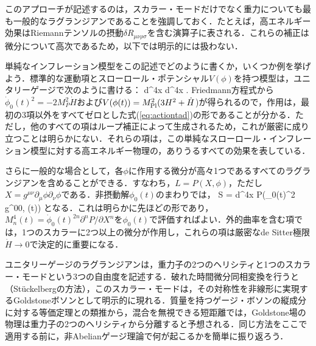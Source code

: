 このアプローチが記述するのは，スカラー・モードだけでなく重力についても最も一般的なラグランジアンであることを強調しておく．たとえば，高エネルギー効果はRiemannテンソルの摂動$\delta R_{\mu\nu\rho\sigma}$を含む演算子に表される．これらの補正は微分について高次であるため，以下では明示的には扱わない．

単純なインフレーション模型をこの記述でどのように書くか，いくつか例を挙げよう．標準的な運動項とスローロール・ポテンシャル$V(\phi)$を持つ模型は，ユニタリーゲージで次のように書ける：
\be
\int \! d^4x \: 
  \to  \int \!
d^4x \:   \; .
\ee
Friedmann方程式から$\dot\phi_0(t)^2=-2M^2_P \dot{H}$および$V(\phi(t))=M_{\rm Pl}^2 (3H^2+\dot H$)が得られるので，作用は，最初の3項以外をすべてゼロとした式(\ref{eq:actiontad})の形であることが分かる．ただし，他のすべての項はループ補正によって生成されるため，これが厳密に成り立つことは明らかにない．それらの項は，この単純なスローロール・インフレーション模型に対する高エネルギー物理の，ありうるすべての効果を表している．

さらに一般的な場合として，各$\phi$に作用する微分が高々1つであるすべてのラグランジアンを含めることができる．すなわち，$L= P(X,\phi)$，ただし$X=g^{\mu\nu}\partial_\mu\phi\partial_\nu\phi$である．非摂動解$\phi_0(t)$のまわりでは，
\be
S = \int \! d^4x \:  \;  P(\dot\phi_0(t)^2 g^{00}, \phi(t))
\ee
となる．これは明らかに先ほどの形であり，$M_n^4(t) =\dot\phi_0(t)^{2n} \partial^n P/\partial X^n$を$\phi_0(t)$で評価すればよい．外的曲率を含む項では，1つのスカラーに2つ以上の微分が作用し，これらの項は厳密なde Sitter極限$\dot H \to 0$で決定的に重要になる．


ユニタリーゲージのラグランジアンは，重力子の2つのヘリシティと1つのスカラー・モードという3つの自由度を記述する．破れた時間微分同相変換を行うと（St\"uckelbergの方法），このスカラー・モードは，その対称性を非線形に実現するGoldstoneボソンとして明示的に現れる．質量を持つゲージ・ボソンの縦成分に対する等価定理\cite{Cornwall:1974km}との類推から，混合を無視できる短距離では，Goldstone場の物理は重力子の2つのヘリシティから分離すると予想される．同じ方法をここで適用する前に，非Abelianゲージ理論で何が起こるかを簡単に振り返ろう．

